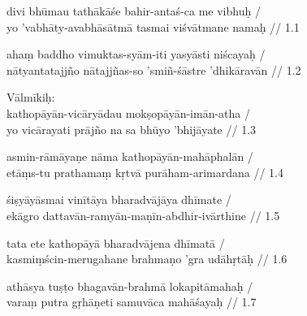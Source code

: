 \documentclass[a4paper,parskip,12pt]{scrarticle}
\begin{document}
\begin{otherlanguage}{iast}
  divi bhūmau tathākāśe bahir-antaś-ca me vibhuḥ /\\
  yo 'vabhāty-avabhāsātmā tasmai viśvātmane namaḥ // 1.1

  ahaṃ baddho vimuktas-syām-iti yasyāsti niścayaḥ /\\
  nātyantatajjño nātajjñas-so 'smiñ-śāstre 'dhikāravān // 1.2

  Vālmīkiḥ:\\
  kathopāyān-vicāryādau mokṣopāyān-imān-atha /\\
  yo vicārayati prājño na sa bhūyo 'bhijāyate // 1.3

  asmin-rāmāyaṇe nāma kathopāyān-mahāphalān /\\
  etāṃs-tu prathamaṃ kṛtvā purāham-arimardana // 1.4

  śiṣyāyāsmai vinītāya bharadvājāya dhīmate /\\
  ekāgro dattavān-ramyān-maṇīn-abdhir-ivārthine // 1.5

  tata ete kathopāyā bharadvājena dhīmatā /\\
  kasmiṃścin-merugahane brahmaṇo 'gra udāhṛtāḥ // 1.6

  athāsya tuṣṭo bhagavān-brahmā lokapitāmahaḥ /\\
  varaṃ putra gṛhāṇeti samuvāca mahāśayaḥ // 1.7
\end{otherlanguage}
\end{document}
